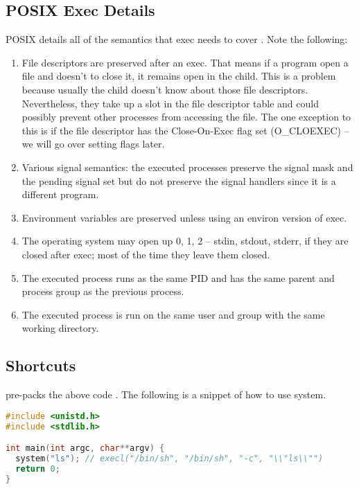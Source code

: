 \subsection{POSIX Exec Details}

POSIX details all of the semantics that exec needs to cover \cite{exec_2018}.
Note the following:

\begin{enumerate}
\item File descriptors are preserved after an exec. That means if a program open a file and doesn't to close it, it remains open in the child.
  This is a problem because usually the child doesn't know about those file descriptors. Nevertheless, they take up a slot in the file descriptor table and could possibly prevent other processes from accessing the file.
  The one exception to this is if the file descriptor has the Close-On-Exec flag set (O\_CLOEXEC) -- we will go over setting flags later.
\item Various signal semantics: the executed processes preserve the signal mask and the pending signal set but do not preserve the signal handlers since it is a different program.
\item Environment variables are preserved unless using an environ version of exec.
\item The operating system may open up 0, 1, 2 -- stdin, stdout, stderr, if they are closed after exec; most of the time they leave them closed.
\item The executed process runs as the same PID and has the same parent and process group as the previous process.
\item The executed process is run on the same user and group with the same working directory.
\end{enumerate}

\subsection{Shortcuts}

 pre-packs the above code \cite[P. 371]{jones2010wg14}.
The following is a snippet of how to use system.

\begin{lstlisting}[language=C]
#include <unistd.h>
#include <stdlib.h>

int main(int argc, char**argv) {
  system("ls"); // execl("/bin/sh", "/bin/sh", "-c", "\\"ls\\"")
  return 0;
}
\end{lstlisting}

